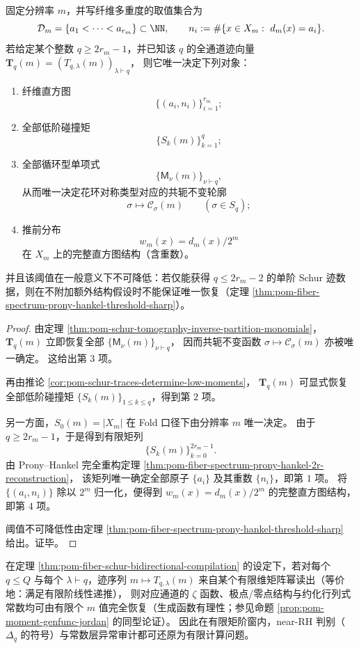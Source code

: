 \begin{theorem}\label{thm:pom-single-q-schur-traces-complete-fiber-spectrum}
固定分辨率 \(m\)，并写纤维多重度的取值集合为
\[
\mathcal{D}_m=\{a_1<\cdots<a_{r_m}\}\subset\NN,
\qquad
n_i:=\#\{x\in X_m:\ d_m(x)=a_i\}.
\]
若给定某个整数 \(q\ge 2r_m-1\)，并已知该 \(q\) 的全通道迹向量
\(
\mathbf T_q(m)=(T_{q,\lambda}(m))_{\lambda\vdash q}
\)，
则它唯一决定下列对象：
\begin{enumerate}
  \item 纤维直方图
  \[
  \{(a_i,n_i)\}_{i=1}^{r_m};
  \]
  \item 全部低阶碰撞矩
  \[
  \{S_k(m)\}_{k=1}^{q};
  \]
  \item 全部循环型单项式
  \[
  \{\mathsf{M}_\nu(m)\}_{\nu\vdash q},
  \]
  从而唯一决定花环对称类型对应的共轭不变轮廓
  \[
  \sigma\longmapsto \mathcal C_\sigma(m)
  \qquad(\sigma\in S_q);
  \]
  \item 推前分布
  \[
  w_m(x)=d_m(x)/2^m
  \]
  在 \(X_m\) 上的完整直方图结构（含重数）。
\end{enumerate}
并且该阈值在一般意义下不可降低：若仅能获得 \(q\le 2r_m-2\) 的单阶 Schur 迹数据，则在不附加额外结构假设时不能保证唯一恢复（定理 \ref{thm:pom-fiber-spectrum-prony-hankel-threshold-sharp}）。
\end{theorem}
\begin{proof}
由定理 \ref{thm:pom-schur-tomography-inverse-partition-monomials}，
\(\mathbf T_q(m)\) 立即恢复全部 \(\{\mathsf M_\nu(m)\}_{\nu\vdash q}\)，
因而共轭不变函数 \(\sigma\mapsto \mathcal C_\sigma(m)\) 亦被唯一确定。
这给出第 \(3\) 项。

再由推论 \ref{cor:pom-schur-traces-determine-low-moments}，
\(\mathbf T_q(m)\) 可显式恢复全部低阶碰撞矩 \(\{S_k(m)\}_{1\le k\le q}\)，得到第 \(2\) 项。

另一方面，\(S_0(m)=|X_m|\) 在 Fold 口径下由分辨率 \(m\) 唯一决定。
由于 \(q\ge 2r_m-1\)，于是得到有限矩列
\[
\{S_k(m)\}_{k=0}^{2r_m-1}.
\]
由 Prony--Hankel 完全重构定理 \ref{thm:pom-fiber-spectrum-prony-hankel-2r-reconstruction}，
该矩列唯一确定全部原子 \(\{a_i\}\) 及其重数 \(\{n_i\}\)，即第 \(1\) 项。
将 \(\{(a_i,n_i)\}\) 除以 \(2^m\) 归一化，便得到 \(w_m(x)=d_m(x)/2^m\) 的完整直方图结构，即第 \(4\) 项。

阈值不可降低性由定理 \ref{thm:pom-fiber-spectrum-prony-hankel-threshold-sharp} 给出。证毕。
\end{proof}

\begin{corollary}[有限矩阶窗内的全谱审计可判定性]\label{cor:pom-finite-q-window-decidable-full-audit}
在定理 \ref{thm:pom-fiber-schur-bidirectional-compilation} 的设定下，若对每个 \(q\le Q\) 与每个 \(\lambda\vdash q\)，迹序列 \(m\mapsto T_{q,\lambda}(m)\) 来自某个有限维矩阵幂读出（等价地：满足有限阶线性递推），
则对应通道的 \(\zeta\) 函数、极点/零点结构与约化行列式常数均可由有限个 \(m\) 值完全恢复（生成函数有理性；参见命题 \ref{prop:pom-moment-genfunc-jordan} 的同型论证）。
因此在有限矩阶窗内，near-RH 判别（\(\Delta_q\) 的符号）与常数层异常审计都可还原为有限计算问题。
\end{corollary}

